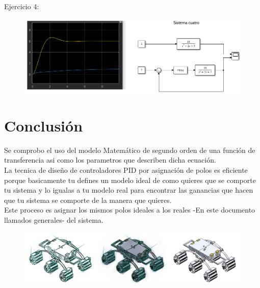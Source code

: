\documentclass[12pt,letterpaper]{article}
\begin{document}
Ejercicio 4: 

\begin{center}

\begin{figure}[h!]
\begin{floatrow}
\centering
\includegraphics[width=13.1cm]{sim4.png}
\label{fig:tubes}
\end{floatrow}
\end{figure} 

\end{center} \hfill \break 



\section{Conclusión}

Se comprobo el uso del modelo Matemático de segundo orden de una función de transferencia asi como los parametros que describen dicha ecuación. \\ 
La tecnica de diseño de controladores PID por asignación de polos es eficiente porque basicamente tu defines un modelo ideal de como quieres que se comporte tu sistema y lo igualas a tu modelo real para encontrar las ganancias que hacen que tu sistema se comporte de la manera que quieres. \\ Este proceso es asignar los mismos polos ideales a los reales -En este documento llamados generales- del sistema.  

\begin{center}
\begin{figure}[h!]
\begin{floatrow}
\centering
\includegraphics[width=13.1cm]{mark-1.jpeg}
\label{fig:tubes}
\end{floatrow}
\end{figure} 
\end{center} \hfill \break 
 
\end{document}
